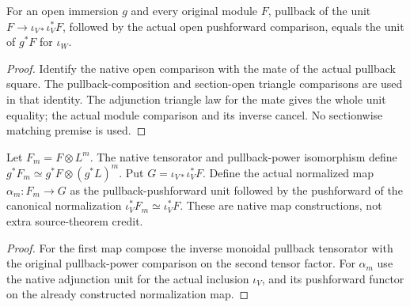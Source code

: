 \begin{lemma}
\label{lem:cech-line-native-open-unit}
\leanok
For an open immersion $g$ and every original module $F$, pullback of
the unit $F\to\iota_{V*}\iota_V^*F$, followed by the actual open
pushforward comparison, equals the unit of $g^*F$ for $\iota_W$.
\end{lemma}
\begin{proof}
Identify the native open comparison with the mate of the actual
pullback square. The pullback-composition and section-open triangle
comparisons are used in that identity. The adjunction triangle law for
the mate gives the whole unit equality; the actual module comparison
and its inverse cancel. No sectionwise matching premise is used.
\end{proof}

\begin{definition}
\label{def:cech-line-native-normalized-pushforward}
\leanok
Let $F_m=F\otimes L^m$. The native tensorator and pullback-power
isomorphism define $g^*F_m\simeq g^*F\otimes(g^*L)^m$.
Put $G=\iota_{V*}\iota_V^*F$. Define the actual normalized map
$\alpha_m:F_m\to G$ as the pullback-pushforward unit followed by the
pushforward of the canonical normalization $\iota_V^*F_m\simeq\iota_V^*F$.
These are native map constructions, not extra source-theorem credit.
\end{definition}
\begin{proof}
For the first map compose the inverse monoidal pullback tensorator with
the original pullback-power comparison on the second tensor factor.
For $\alpha_m$ use the native adjunction unit for the actual inclusion
$\iota_V$, and its pushforward functor on the already constructed
normalization map.
\end{proof}

